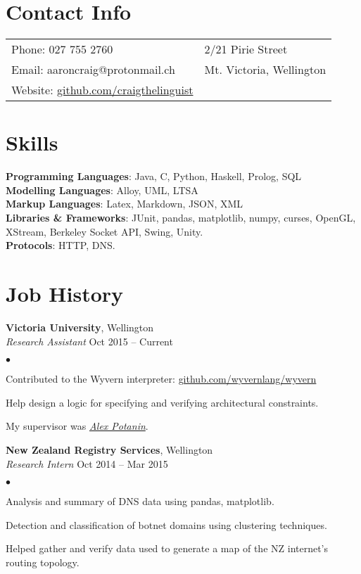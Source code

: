 \documentclass[margin,line]{res}
\newenvironment{list2}{
  \begin{list}{$\bullet$}{%
      \setlength{\itemsep}{0in}
      \setlength{\parsep}{0in} \setlength{\parskip}{0in}
      \setlength{\topsep}{0in} \setlength{\partopsep}{0in}
      \setlength{\leftmargin}{0.2in}}}
  {\end{list}}
\begin{document}
\begin{resume}

  \section{\sc Contact Info}
    \vspace{.05in}
    \begin{tabular}{@{}p{3.5in}p{3in}}
      {Phone}: 027 755 2760 & 2/21 Pirie Street \\
      {Email}: aaroncraig@protonmail.ch & Mt. Victoria, Wellington \\
      {Website}: \url{github.com/craigthelinguist}
    \end{tabular}

   \section{\sc Skills}
    {\bf Programming Languages}: Java, C, Python, Haskell, Prolog, SQL\\
    {\bf Modelling Languages}: Alloy, UML, LTSA\\
    {\bf Markup Languages}: Latex, Markdown, JSON, XML\\
    {\bf Libraries \& Frameworks}: JUnit, pandas, matplotlib, numpy, curses, OpenGL, XStream, Berkeley Socket API, Swing, Unity.\\
    {\bf Protocols}: HTTP, DNS.

  \section{\sc Job History}
  
  	{\bf Victoria University}, Wellington\\
  	{\em Research Assistant} \hfill {Oct 2015 -- Current}
  	\begin{list2}
  		\item Contributed to the Wyvern interpreter: \url{github.com/wyvernlang/wyvern}
		\item Help design a logic for specifying and verifying architectural constraints.
  		\item My supervisor was \href{http://homepages.mcs.vuw.ac.nz/~alex/}{\textit{Alex Potanin}}.
	\end{list2}
  
    {\bf New Zealand Registry Services}, Wellington\\
    {\em Research Intern} \hfill {Oct 2014 -- Mar 2015}
    \begin{list2}
	\item Analysis and summary of DNS data using pandas, matplotlib.
	\item Detection and classification of botnet domains using clustering techniques.
	\item Helped gather and verify data used to generate a map of the NZ internet's routing topology.
    \end{list2}


\end{resume}
\end{document}
